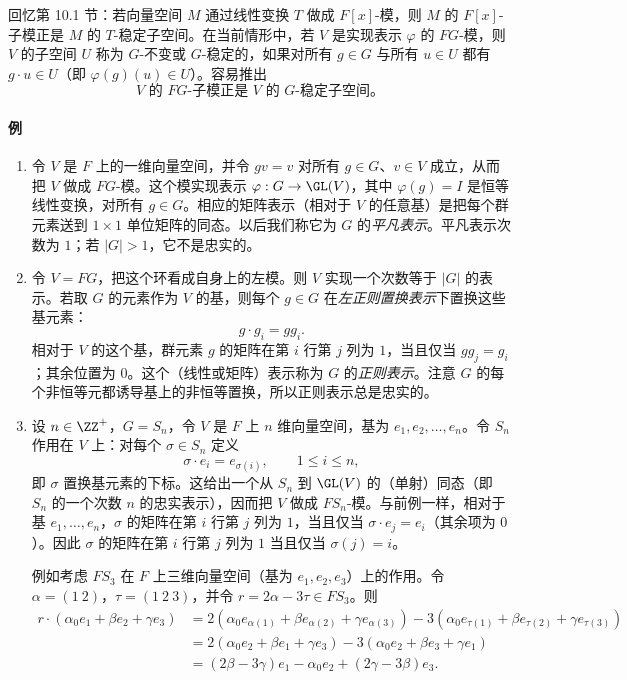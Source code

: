 回忆第 10.1 节：若向量空间 $M$ 通过线性变换 $T$ 做成 $F[x]$-模，则 $M$ 的 $F[x]$-子模正是 $M$ 的 $T$-稳定子空间。在当前情形中，若 $V$ 是实现表示 $\varphi$ 的 $FG$-模，则 $V$ 的子空间 $U$ 称为 $G$-不变或 $G$-稳定的，如果对所有 $g\in G$ 与所有 $u\in U$ 都有 $g\cdot u\in U$（即 $\varphi(g)(u)\in U$）。容易推出
\[
  V\text{ 的 }FG\text{-子模正是 }V\text{ 的 }G\text{-稳定子空间。}
\]

\paragraph{例}
\begin{enumerate}[label=(\arabic*)]
  \item 令 $V$ 是 $F$ 上的一维向量空间，并令 $gv=v$ 对所有 $g\in G$、$v\in V$ 成立，从而把 $V$ 做成 $FG$-模。这个模实现表示 $\varphi:G\to\GL(V)$，其中 $\varphi(g)=I$ 是恒等线性变换，对所有 $g\in G$。相应的矩阵表示（相对于 $V$ 的任意基）是把每个群元素送到 $1\times1$ 单位矩阵的同态。以后我们称它为 $G$ 的\emph{平凡表示}。平凡表示次数为 $1$；若 $|G|>1$，它不是忠实的。

  \item 令 $V=FG$，把这个环看成自身上的左模。则 $V$ 实现一个次数等于 $|G|$ 的表示。若取 $G$ 的元素作为 $V$ 的基，则每个 $g\in G$ 在\emph{左正则置换表示}下置换这些基元素：
  \[
    g\cdot g_i=gg_i.
  \]
  相对于 $V$ 的这个基，群元素 $g$ 的矩阵在第 $i$ 行第 $j$ 列为 $1$，当且仅当 $gg_j=g_i$；其余位置为 $0$。这个（线性或矩阵）表示称为 $G$ 的\emph{正则表示}。注意 $G$ 的每个非恒等元都诱导基上的非恒等置换，所以正则表示总是忠实的。

  \item 设 $n\in\ZZ^+$，$G=S_n$，令 $V$ 是 $F$ 上 $n$ 维向量空间，基为 $e_1,e_2,\ldots,e_n$。令 $S_n$ 作用在 $V$ 上：对每个 $\sigma\in S_n$ 定义
  \[
    \sigma\cdot e_i=e_{\sigma(i)},\qquad 1\leq i\leq n,
  \]
  即 $\sigma$ 置换基元素的下标。这给出一个从 $S_n$ 到 $\GL(V)$ 的（单射）同态（即 $S_n$ 的一个次数 $n$ 的忠实表示），因而把 $V$ 做成 $FS_n$-模。与前例一样，相对于基 $e_1,
  \ldots,e_n$，$\sigma$ 的矩阵在第 $i$ 行第 $j$ 列为 $1$，当且仅当 $\sigma\cdot e_j=e_i$（其余项为 $0$）。因此 $\sigma$ 的矩阵在第 $i$ 行第 $j$ 列为 $1$ 当且仅当 $\sigma(j)=i$。

  例如考虑 $FS_3$ 在 $F$ 上三维向量空间（基为 $e_1,e_2,e_3$）上的作用。令 $\alpha=(1\ 2)$，$\tau=(1\ 2\ 3)$，并令 $r=2\alpha-3\tau\in FS_3$。则
  \[
  \begin{aligned}
    r\cdot(\alpha_0e_1+\beta e_2+\gamma e_3)
    &=2(\alpha_0e_{\alpha(1)}+\beta e_{\alpha(2)}+\gamma e_{\alpha(3)})
      -3(\alpha_0e_{\tau(1)}+\beta e_{\tau(2)}+\gamma e_{\tau(3)})\\
    &=2(\alpha_0e_2+\beta e_1+\gamma e_3)-3(\alpha_0e_2+\beta e_3+\gamma e_1)\\
    &=(2\beta-3\gamma)e_1-\alpha_0e_2+(2\gamma-3\beta)e_3.
  \end{aligned}
  \]


\end{enumerate}
